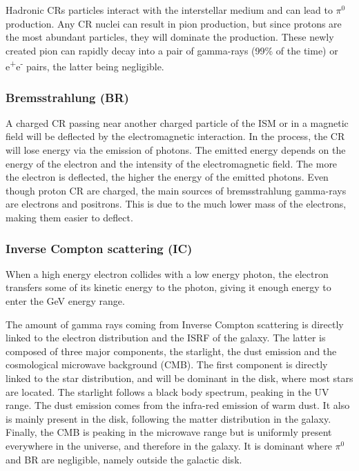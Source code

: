 Hadronic CRs  particles interact with the interstellar medium and can lead to $\pi^0$ production. Any CR nuclei can result in pion production, but since protons are the most abundant particles, they will dominate the production. 
These newly created pion can rapidly decay into a pair of gamma-rays (99\% of the time) or e\textsuperscript{+}e\textsuperscript{-} pairs, the latter being negligible.




\subsubsection{Bremsstrahlung (BR)}


A charged CR passing near another charged particle of the ISM or in a magnetic field will be deflected by the electromagnetic interaction. In the process, the CR will lose energy via the emission of photons. The emitted energy depends on the energy of the electron and the intensity of the electromagnetic field. The more the electron is deflected, the higher the energy of the emitted photons.
Even though proton CR are charged, the main sources of bremsstrahlung gamma-rays are electrons and positrons. This is due to the much lower mass of the electrons, making them easier to deflect.%



\subsubsection{Inverse Compton scattering (IC)}


When a high energy electron collides with a low energy photon, the electron transfers some of its kinetic energy to the photon, giving it enough energy to enter the GeV energy range.

The amount of gamma rays coming from Inverse Compton scattering is directly linked to the electron distribution and the ISRF of the galaxy. The latter is composed of three major components, the starlight, the dust emission and the cosmological microwave background (CMB). The first component is directly linked to the star distribution, and will be dominant in the disk, where most stars are located. The starlight follows a black body spectrum, peaking in the UV range. The dust emission comes from the infra-red emission of warm dust. It also is mainly present in the disk, following the matter distribution in the galaxy. Finally, the CMB is peaking in the microwave range but is uniformly present everywhere in the universe, and therefore in the galaxy. It is dominant where $\pi^{0}$ and BR are negligible, namely outside the galactic disk.



